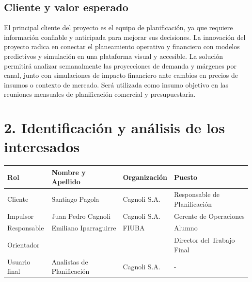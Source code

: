 \documentclass[
11pt, %
]{charter}
\begin{document}
\subsection*{Cliente y valor esperado}
El principal cliente del proyecto es el equipo de planificación, ya que requiere información confiable y anticipada para mejorar sus decisiones. La innovación del proyecto radica en conectar el planeamiento operativo y financiero con modelos predictivos y simulación en una plataforma visual y accesible.
La solución permitirá analizar semanalmente las proyecciones de demanda y márgenes por canal, junto con simulaciones de impacto financiero ante cambios en precios de insumos o contexto de mercado. Será utilizada como insumo objetivo en las reuniones mensuales de planificación comercial y presupuestaria.

\section{2. Identificación y análisis de los interesados}
\label{sec:interesados}


\begin{table}[ht]
\begin{tabularx}{\linewidth}{@{}|l|X|X|l|@{}}
\hline
\rowcolor[HTML]{C0C0C0} 
Rol           & Nombre y Apellido & Organización 	& Puesto 	\\ \hline
Cliente       & Santiago Pagola      &	Cagnoli S.A.	&	Responsable de Planificación       	\\ \hline
Impulsor      & Juan Pedro Cagnoli                  &  Cagnoli S.A.            	&  Gerente de Operaciones      	\\ \hline
Responsable   & Emiliano Iparraguirre       & FIUBA        	& Alumno 	\\ \hline
Orientador    & \supname	      & \pertesupname 	& Director del Trabajo Final \\ \hline
Usuario final & Analistas de Planificación                  & Cagnoli S.A.             	&  -      	\\ \hline
\end{tabularx}
\end{table}
\pagebreak
\end{document}
